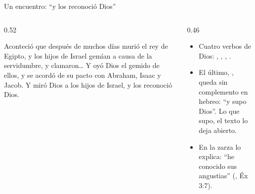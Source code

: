 \begin{frame}{Un encuentro: ``y los reconoció Dios''}
\begin{columns}[t,onlytextwidth]
\begin{column}{0.52\textwidth}
\begin{cita}Aconteció que después de muchos días murió el rey de Egipto, y los hijos de Israel gemían a causa de la servidumbre, y clamaron\ldots{} Y oyó Dios el gemido de ellos, y se acordó de su pacto con Abraham, Isaac y Jacob. Y miró Dios a los hijos de Israel, y los reconoció Dios.\end{cita}
\begin{center}\end{center}
\end{column}
\begin{column}{0.46\textwidth}\small
\begin{itemize}
\item Cuatro verbos de Dios: , , , .
\item El último, , queda sin complemento en hebreo: ``y supo Dios''. Lo que supo, el texto lo deja abierto.
\item En la zarza lo explica: ``he conocido sus angustias'' (, Éx 3:7).
\end{itemize}
\end{column}
\end{columns}
\end{frame}

